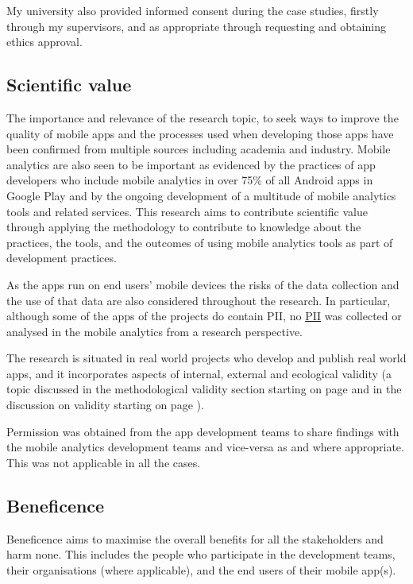 My university also provided informed consent during the case studies, firstly through my supervisors, and as appropriate through requesting and obtaining ethics approval.

\subsection{Scientific value}
The importance and relevance of the research topic, to seek ways to improve the quality of mobile apps and the processes used when developing those apps have been confirmed from multiple sources including academia and industry. Mobile analytics are also seen to be important as evidenced by the practices of app developers who include mobile analytics in over 75\% of all Android apps in Google Play and by the ongoing development of a multitude of mobile analytics tools and related services. This research aims to contribute scientific value through applying the methodology to contribute to knowledge about the practices, the tools, and the outcomes of using mobile analytics tools as part of development practices. 

As the apps run on end users' mobile devices the risks of the data collection and the use of that data are also considered throughout the research. In particular, although some of the apps of the projects do contain PII, no \href{glossary-pii}{PII} was collected or analysed in the mobile analytics from a research perspective.

The research is situated in real world projects who develop and publish real world apps, and it incorporates aspects of internal, external and ecological validity (a topic discussed in the methodological validity section starting on page \pageref{methodology-threats-to-validity-section} and in the discussion on validity starting on page \pageref{discussion-threats-to-validity-section}).

Permission was obtained from the app development teams to share findings with the mobile analytics development teams and vice-versa as and where appropriate. This was not applicable in all the cases.


\subsection{Beneficence}
Beneficence aims to maximise the overall benefits for all the stakeholders and harm none. This includes the people who participate in the development teams, their organisations (where applicable), and the end users of their mobile app(s). 

